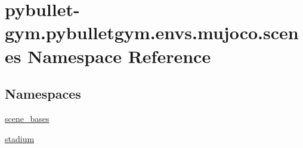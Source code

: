 \hypertarget{namespacepybullet-gym_1_1pybulletgym_1_1envs_1_1mujoco_1_1scenes}{}\section{pybullet-\/gym.pybulletgym.\+envs.\+mujoco.\+scenes Namespace Reference}
\label{namespacepybullet-gym_1_1pybulletgym_1_1envs_1_1mujoco_1_1scenes}
\subsection*{Namespaces}
\begin{DoxyCompactItemize}
\item 
 \hyperlink{namespacepybullet-gym_1_1pybulletgym_1_1envs_1_1mujoco_1_1scenes_1_1scene__bases}{scene\+\_\+bases}
\item 
 \hyperlink{namespacepybullet-gym_1_1pybulletgym_1_1envs_1_1mujoco_1_1scenes_1_1stadium}{stadium}
\end{DoxyCompactItemize}
